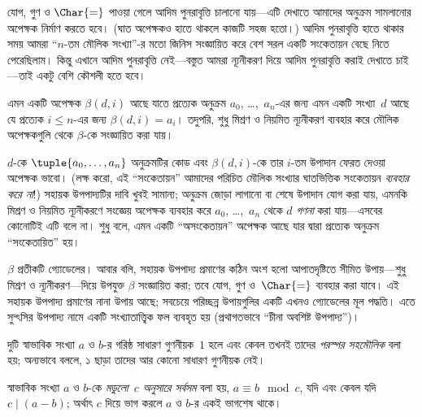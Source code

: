 \documentclass[../../../include/open-logic-section]{subfiles}
\begin{document}


যোগ, গুণ ও $\Char{=}$ পাওয়া গেলে আদিম পুনরাবৃত্তি চালানো যায়—এটি দেখাতে
আমাদের অনুক্রম সামলানোর অপেক্ষক নির্মাণ করতে হবে। (ঘাত অপেক্ষকও হাতে থাকলে
কাজটি সহজ হতো।) আদিম পুনরাবৃত্তি হাতে থাকার সময় আমরা ``$n$-তম মৌলিক
সংখ্যা''-র মতো জিনিস সংজ্ঞায়িত করে বেশ সরল একটি সংকেতায়ন বেছে নিতে
পেরেছিলাম। কিন্তু এখানে আদিম পুনরাবৃত্তি নেই—বস্তুত আমরা ন্যূনীকরণ দিয়ে
আদিম পুনরাবৃত্তি করাই দেখাতে চাই—তাই একটু বেশি কৌশলী হতে হবে।

\begin{lem}
এমন একটি অপেক্ষক $\beta(d,i)$ আছে যাতে প্রত্যেক অনুক্রম $a_0$,
\dots,~$a_n$-এর জন্য এমন একটি সংখ্যা~$d$ আছে যে প্রত্যেক $i \le n$-এর জন্য
$\beta(d,i) = a_i$। তদুপরি, শুধু মিশ্রণ ও নিয়মিত ন্যূনীকরণ ব্যবহার করে
মৌলিক অপেক্ষকগুলি থেকে $\beta$-কে সংজ্ঞায়িত করা যায়।
\end{lem}

$d$-কে $\tuple{a_0, \dots, a_n}$ অনুক্রমটির কোড এবং $\beta(d,i)$-কে তার
$i$-তম উপাদান ফেরত দেওয়া অপেক্ষক ভাবো। (লক্ষ করো, এই ``সংকেতায়ন'' আমাদের
পরিচিত মৌলিক সংখ্যার ঘাতভিত্তিক সংকেতায়ন \emph{ব্যবহার করে না}!) সহায়ক
উপপাদ্যটির দাবি খুবই সামান্য; অনুক্রম জোড়া লাগানো বা শেষে উপাদান যোগ করা
যায়, এমনকি মিশ্রণ ও নিয়মিত ন্যূনীকরণে সংজ্ঞেয় অপেক্ষক ব্যবহার করে $a_0$,
\dots,~$a_n$ থেকে $d$ \emph{গণনা} করা যায়—এসবের কোনোটিই এটি বলে না। শুধু
বলে, এমন একটি ``অসংকেতায়ন'' অপেক্ষক আছে যার দ্বারা প্রত্যেক অনুক্রম
``সংকেতায়িত'' হয়।

$\beta$ প্রতীকটি গ্যোডেলের। আবার বলি, সহায়ক উপপাদ্য প্রমাণের কঠিন অংশ হলো
আপাতদৃষ্টিতে সীমিত উপায়—শুধু মিশ্রণ ও ন্যূনীকরণ—দিয়ে উপযুক্ত $\beta$
সংজ্ঞায়িত করা; তবে যোগ, গুণ ও~$\Char{=}$ ব্যবহার করা যাবে। এই সহায়ক উপপাদ্য
প্রমাণের নানা উপায় আছে; সবচেয়ে পরিচ্ছন্ন উপায়গুলির একটি এখনও গ্যোডেলের
মূল পদ্ধতি। এতে সুন্ৎসির উপপাদ্য নামে একটি সংখ্যাতাত্ত্বিক ফল ব্যবহৃত হয়
(প্রথাগতভাবে ``চীনা অবশিষ্ট উপপাদ্য'')।

\begin{defn}
দুটি স্বাভাবিক সংখ্যা $a$ ও $b$-র গরিষ্ঠ সাধারণ গুণনীয়ক~$1$ হলে এবং কেবল
তখনই তাদের \emph{পরস্পর সহমৌলিক} বলা হয়; অন্যভাবে বললে, ১ ছাড়া তাদের
আর কোনো সাধারণ গুণনীয়ক নেই।
\end{defn}

\begin{defn}
স্বাভাবিক সংখ্যা $a$ ও $b$-কে \emph{মডুলো~$c$ অনুসারে সর্বসম} বলা হয়,
$a \equiv b \mod c$, যদি এবং কেবল যদি $c \mid (a-b)$; অর্থাৎ $c$ দিয়ে ভাগ
করলে $a$ ও $b$-র একই ভাগশেষ থাকে।
\end{defn}
\end{document}

